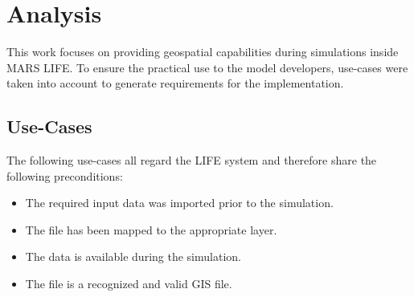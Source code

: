
\chapter{Analysis}
This work focuses on providing geospatial capabilities during simulations inside MARS LIFE. To ensure the practical use to the model developers, use-cases were taken into account to generate requirements for the implementation.



\section{Use-Cases}
The following use-cases all regard the LIFE system and therefore share the following preconditions:
\begin{itemize}
	\item The required input data was imported prior to the simulation.
	\item The file has been mapped to the appropriate layer.
	\item The data is available during the simulation.
	\item The file is a recognized and valid GIS file.
\end{itemize}



